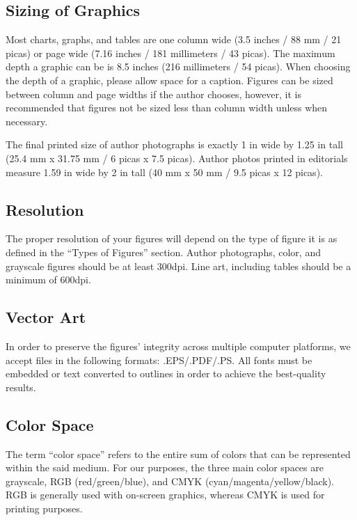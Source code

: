 \documentclass[correspondence]{IEEEtaes}
\begin{document}
\subsection{Sizing of Graphics}

Most charts, graphs, and tables are one column wide (3.5 inches / 88 mm / 21 picas) or page wide (7.16 inches / 181 millimeters / 43 picas). The maximum depth a graphic can be is 8.5 inches (216 millimeters / 54 picas). When choosing the depth of a graphic, please allow space for a caption. Figures can be sized between column and page widths if the author chooses, however, it is recommended that figures not be sized less than column width unless when necessary.

The final printed size of author photographs is exactly 1 in wide by 1.25 in tall (25.4 mm x 31.75 mm / 6 picas x 7.5 picas). Author photos printed in editorials measure 1.59 in wide by 2 in tall (40 mm x 50 mm / 9.5 picas x 12 picas).

\subsection{Resolution}

The proper resolution of your figures will depend on the type of figure it is as defined in the ``Types of Figures'' section. Author photographs, color, and grayscale figures should be at least 300dpi. Line art, including tables should be a minimum of 600dpi.

\subsection{Vector Art}

In order to preserve the figures' integrity across multiple computer platforms, we accept files in the following formats: .EPS/.PDF/.PS. All fonts must be embedded or text converted to outlines in order to achieve the best-quality results.

\subsection{Color Space}

The term ``color space'' refers to the entire sum of colors that can be represented within the said medium. For our purposes, the three main color spaces are grayscale, RGB (red/green/blue), and CMYK (cyan/magenta/yellow/black). RGB is generally used with on-screen graphics, whereas CMYK is used for printing purposes.
\end{document}

